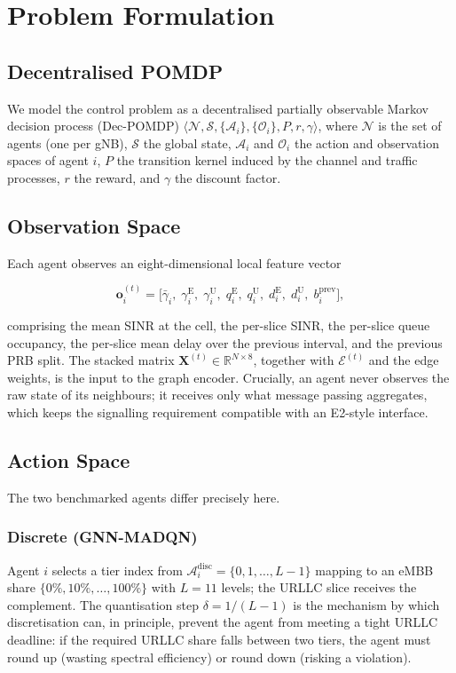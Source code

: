 \documentclass[journal]{IEEEtran}
\begin{document}
\section{Problem Formulation}\label{sec:decpomdp}

\subsection{Decentralised POMDP}
We model the control problem as a decentralised partially observable
Markov decision process (Dec-POMDP)
$\langle \mathcal{N}, \mathcal{S}, \{\mathcal{A}_i\},
\{\mathcal{O}_i\}, P, r, \gamma \rangle$, where $\mathcal{N}$ is the
set of agents (one per gNB), $\mathcal{S}$ the global state,
$\mathcal{A}_i$ and $\mathcal{O}_i$ the action and observation spaces
of agent $i$, $P$ the transition kernel induced by the channel and
traffic processes, $r$ the reward, and $\gamma$ the discount factor.

\subsection{Observation Space}
Each agent observes an eight-dimensional local feature vector

\begin{equation}
\mathbf{o}_i^{(t)} = \big[\bar{\gamma}_i,\;
\gamma_i^{\mathrm{E}},\; \gamma_i^{\mathrm{U}},\;
q_i^{\mathrm{E}},\; q_i^{\mathrm{U}},\;
d_i^{\mathrm{E}},\; d_i^{\mathrm{U}},\;
b_i^{\mathrm{prev}}\big],
\label{eq:obs}
\end{equation}

comprising the mean SINR at the cell, the per-slice SINR, the per-slice
queue occupancy, the per-slice mean delay over the previous interval,
and the previous PRB split. The stacked matrix
$\mathbf{X}^{(t)} \in \mathbb{R}^{N \times 8}$, together with
$\mathcal{E}^{(t)}$ and the edge weights, is the input to the graph
encoder. Crucially, an agent never observes the raw state of its
neighbours; it receives only what message passing aggregates, which
keeps the signalling requirement compatible with an E2-style interface.

\subsection{Action Space}
The two benchmarked agents differ precisely here.

\subsubsection{Discrete (GNN-MADQN)} Agent $i$ selects a tier index from
$\mathcal{A}_i^{\mathrm{disc}} = \{0, 1, \dots, L-1\}$ mapping to an
eMBB share $\{0\%, 10\%, \dots, 100\%\}$ with $L = 11$ levels; the URLLC
slice receives the complement. The quantisation step
$\delta = 1/(L-1)$ is the mechanism by which discretisation can, in
principle, prevent the agent from meeting a tight URLLC deadline: if
the required URLLC share falls between two tiers, the agent must round
up (wasting spectral efficiency) or round down (risking a violation).
\end{document}

